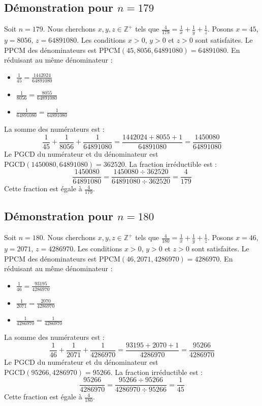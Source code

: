 \documentclass[11pt,a4paper]{article}
\begin{document}
\subsection{Démonstration pour $n = 179$}
Soit $n = 179$. Nous cherchons $x, y, z \in \mathbb{Z}^{+}$ tels que $\frac{4}{179} = \frac{1}{x} + \frac{1}{y} + \frac{1}{z}$.
Posons $x = 45$, $y = 8056$, $z = 64891080$.
Les conditions $x > 0$, $y > 0$ et $z > 0$ sont satisfaites.
Le PPCM des dénominateurs est $\text{PPCM}(45, 8056, 64891080) = 64891080$.
En réduisant au même dénominateur :
\begin{itemize}
    \item $\frac{1}{45} = \frac{1442024}{64891080}$
    \item $\frac{1}{8056} = \frac{8055}{64891080}$
    \item $\frac{1}{64891080} = \frac{1}{64891080}$
\end{itemize}
La somme des numérateurs est :
$$ \frac{1}{45} + \frac{1}{8056} + \frac{1}{64891080} = \frac{1442024 + 8055 + 1}{64891080} = \frac{1450080}{64891080} $$
Le PGCD du numérateur et du dénominateur est $\text{PGCD}(1450080, 64891080) = 362520$.
La fraction irréductible est :
$$ \frac{1450080}{64891080} = \frac{1450080 \div 362520}{64891080 \div 362520} = \frac{4}{179} $$
Cette fraction est égale à $\frac{4}{179}$.

\subsection{Démonstration pour $n = 180$}
Soit $n = 180$. Nous cherchons $x, y, z \in \mathbb{Z}^{+}$ tels que $\frac{4}{180} = \frac{1}{x} + \frac{1}{y} + \frac{1}{z}$.
Posons $x = 46$, $y = 2071$, $z = 4286970$.
Les conditions $x > 0$, $y > 0$ et $z > 0$ sont satisfaites.
Le PPCM des dénominateurs est $\text{PPCM}(46, 2071, 4286970) = 4286970$.
En réduisant au même dénominateur :
\begin{itemize}
    \item $\frac{1}{46} = \frac{93195}{4286970}$
    \item $\frac{1}{2071} = \frac{2070}{4286970}$
    \item $\frac{1}{4286970} = \frac{1}{4286970}$
\end{itemize}
La somme des numérateurs est :
$$ \frac{1}{46} + \frac{1}{2071} + \frac{1}{4286970} = \frac{93195 + 2070 + 1}{4286970} = \frac{95266}{4286970} $$
Le PGCD du numérateur et du dénominateur est $\text{PGCD}(95266, 4286970) = 95266$.
La fraction irréductible est :
$$ \frac{95266}{4286970} = \frac{95266 \div 95266}{4286970 \div 95266} = \frac{1}{45} $$
Cette fraction est égale à $\frac{4}{180}$.
\end{document}
